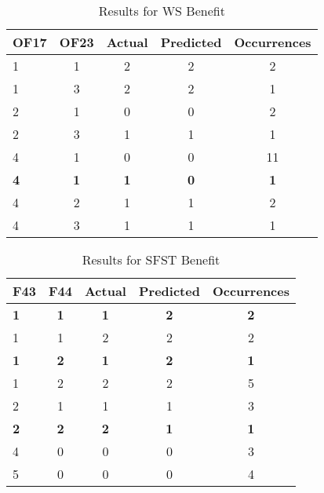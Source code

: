 \begin{table}[htbp]
\centering
\begin{tabular}{|l|c|c|c|c|}
\hline
OF17 & OF23 & Actual & Predicted & Occurrences \\
\hline
1 & 1 & 2 & 2 & 2 \\
1 & 3 & 2 & 2 & 1 \\
2 & 1 & 0 & 0 & 2 \\
2 & 3 & 1 & 1 & 1 \\
4 & 1 & 0 & 0 & 11 \\
\textbf{4} & \textbf{1} & \textbf{1} & \textbf{0} & \textbf{1} \\
4 & 2 & 1 & 1 & 2 \\
4 & 3 & 1 & 1 & 1 \\
\hline
\end{tabular}
\caption{Results for WS Benefit}
\label{tab_analysis:WS_Benefit_results}
\end{table}

\begin{table}[htbp]
\centering
\begin{tabular}{|l|c|c|c|c|}
\hline
F43 & F44 & Actual & Predicted & Occurrences \\
\hline
\textbf{1} & \textbf{1} & \textbf{1} & \textbf{2} & \textbf{2} \\
1 & 1 & 2 & 2 & 2 \\
\textbf{1} & \textbf{2} & \textbf{1} & \textbf{2} & \textbf{1} \\
1 & 2 & 2 & 2 & 5 \\
2 & 1 & 1 & 1 & 3 \\
\textbf{2} & \textbf{2} & \textbf{2} & \textbf{1} & \textbf{1} \\
4 & 0 & 0 & 0 & 3 \\
5 & 0 & 0 & 0 & 4 \\
\hline
\end{tabular}
\caption{Results for SFST Benefit}
\label{tab_analysis:SFST_Benefit_results}
\end{table}

